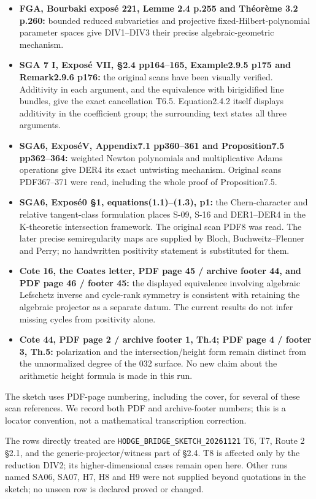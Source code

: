 \documentclass[11pt,a4paper]{article}
\providecommand{\tightlist}{\setlength{\itemsep}{0pt}\setlength{\parskip}{0pt}}
\theoremstyle{definition}
\begin{document}
\begin{itemize}
\tightlist
\item
  \textbf{FGA, Bourbaki exposé 221, Lemme 2.4 p.255 and Théorème 3.2
  p.260:} bounded reduced subvarieties and projective
  fixed-Hilbert-polynomial parameter spaces give DIV1--DIV3 their
  precise algebraic-geometric mechanism.
\item
  \textbf{SGA 7 I, Exposé VII, §2.4 pp164--165, Example2.9.5 p175 and
  Remark2.9.6 p176:} the original scans have been visually verified.
  Additivity in each argument, and the equivalence with birigidified
  line bundles, give the exact cancellation T6.5. Equation2.4.2 itself
  displays additivity in the coefficient group; the surrounding text
  states all three arguments.
\item
  \textbf{SGA6, ExposéV, Appendix7.1 pp360--361 and Proposition7.5
  pp362--364:} weighted Newton polynomials and multiplicative Adams
  operations give DER4 its exact untwisting mechanism. Original scans
  PDF367--371 were read, including the whole proof of Proposition7.5.
\item
  \textbf{SGA6, Exposé0 §1, equations(1.1)--(1.3), p1:} the
  Chern-character and relative tangent-class formulation places S-09,
  S-16 and DER1--DER4 in the K-theoretic intersection framework. The
  original scan PDF8 was read. The later precise semiregularity maps are
  supplied by Bloch, Buchweitz--Flenner and Perry; no handwritten
  positivity statement is substituted for them.
\item
  \textbf{Cote 16, the Coates letter, PDF page 45 / archive footer 44,
  and PDF page 46 / footer 45:} the displayed equivalence involving
  algebraic Lefschetz inverse and cycle-rank symmetry is consistent with
  retaining the algebraic projector as a separate datum. The current
  results do not infer missing cycles from positivity alone.
\item
  \textbf{Cote 44, PDF page 2 / archive footer 1, Th.4; PDF page 4 /
  footer 3, Th.5:} polarization and the intersection/height form remain
  distinct from the unnormalized degree of the 032 surface. No new claim
  about the arithmetic height formula is made in this run.
\end{itemize}

The sketch uses PDF-page numbering, including the cover, for several of
these scan references. We record both PDF and archive-footer numbers;
this is a locator convention, not a mathematical transcription
correction.

The rows directly treated are \texttt{HODGE\_BRIDGE\_SKETCH\_20261121}
T6, T7, Route 2 §2.1, and the generic-projector/witness part of §2.4. T8
is affected only by the reduction DIV2; its higher-dimensional cases
remain open here. Other runs named SA06, SA07, H7, H8 and H9 were not
supplied beyond quotations in the sketch; no unseen row is declared
proved or changed.
\end{document}
